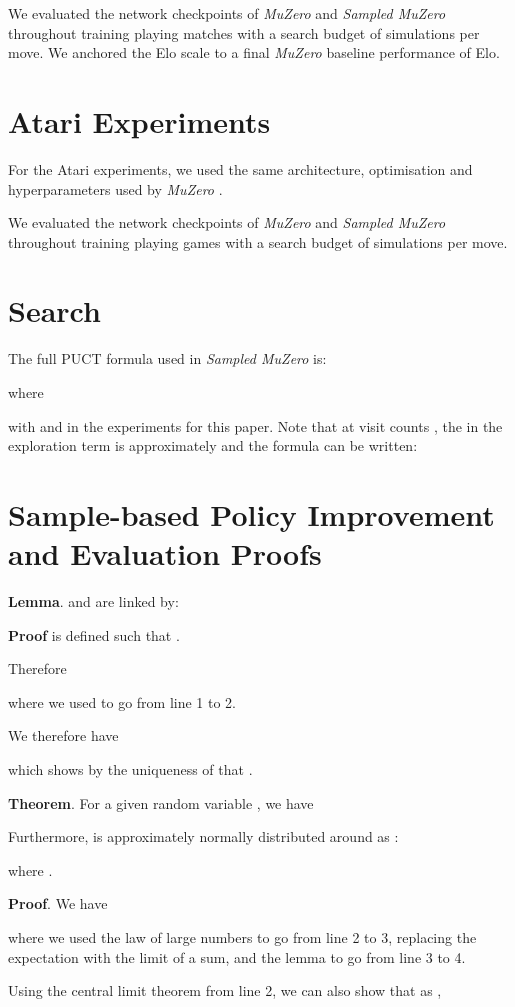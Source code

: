 \documentclass{article}
\newcommand{\muzero}{\emph{MuZero}}
\newcommand{\smuzero}{\emph{Sampled MuZero}}
\begin{document}
We evaluated the network checkpoints of \muzero{} and \smuzero{} throughout training playing  matches with a search budget of  simulations per move. We anchored the Elo scale to a final \muzero{} baseline performance of  Elo.

\section{Atari Experiments}
For the Atari experiments, we used the same architecture, optimisation and hyperparameters used by \muzero{} \cite{muzero}.

We evaluated the network checkpoints of \muzero{} and \smuzero{} throughout training playing  games with a search budget of  simulations per move.

\section{Search}
\label{search}

The full PUCT formula used in \smuzero{} is:

where


with  and  in the experiments for this paper. Note that at visit counts , the  in the exploration term is approximately  and the formula can be written:


\section{Sample-based Policy Improvement and Evaluation Proofs}
\label{proofs}
\textbf{Lemma}.  and  are linked by:


\textbf{Proof}
 is defined such that .

Therefore

where we used  to go from line 1 to 2.

We therefore have

which shows by the uniqueness of  that .

\textbf{Theorem}. For a given random variable , we have


Furthermore,  is approximately normally distributed around  as :

where .

\textbf{Proof}. We have

where we used the law of large numbers to go from line 2 to 3, replacing the expectation with the limit of a sum, and the lemma to go from line 3 to 4.

Using the central limit theorem from line 2, we can also show that as ,
\end{document}
